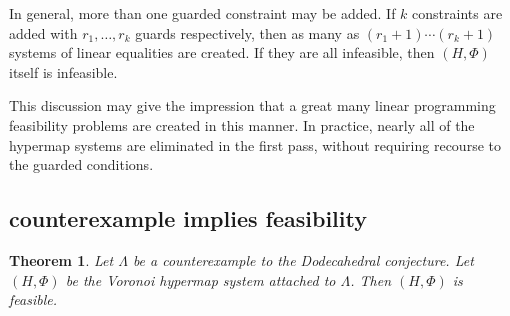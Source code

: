 \documentclass{article} %
\newtheorem{theorem}{Theorem}[section]
\begin{document}
In general, more than one guarded constraint may be added.  If
$k$ constraints are added with $r_1,\ldots,r_k$ guards
respectively, then as many as $(r_1+1)\cdots (r_k+1)$ systems
of linear equalities are created.  If they are all infeasible,
then $(H,\Phi)$ itself is infeasible.

This discussion may give the impression 
that a great many linear programming feasibility
problems are created in this manner.  In practice, nearly all
of the hypermap systems are eliminated in the first pass, without
requiring recourse to the guarded conditions.  



\subsection{counterexample implies feasibility}

\begin{theorem}\label{thm:feasible}  Let $\Lambda$ be a counterexample to the Dodecahedral conjecture.  Let $(H,\Phi)$ be the Voronoi hypermap system attached to $\Lambda$.
Then $(H,\Phi)$ is feasible.
\end{theorem}
\end{document}
